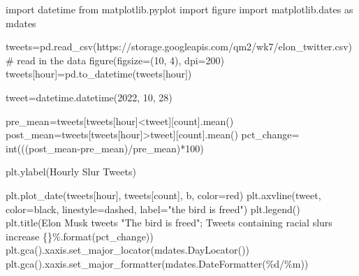 \documentclass[
  letterpaper,
  DIV=11,
  numbers=noendperiod]{scrreprt}
\newenvironment{Shaded}{\begin{snugshade}}{\end{snugshade}}
\newcommand{\BuiltInTok}[1]{\textcolor[rgb]{0.00,0.23,0.31}{#1}}
\newcommand{\CommentTok}[1]{\textcolor[rgb]{0.37,0.37,0.37}{#1}}
\newcommand{\DecValTok}[1]{\textcolor[rgb]{0.68,0.00,0.00}{#1}}
\newcommand{\ImportTok}[1]{\textcolor[rgb]{0.00,0.46,0.62}{#1}}
\newcommand{\NormalTok}[1]{\textcolor[rgb]{0.00,0.23,0.31}{#1}}
\newcommand{\OperatorTok}[1]{\textcolor[rgb]{0.37,0.37,0.37}{#1}}
\newcommand{\SpecialCharTok}[1]{\textcolor[rgb]{0.37,0.37,0.37}{#1}}
\newcommand{\StringTok}[1]{\textcolor[rgb]{0.13,0.47,0.30}{#1}}
\begin{document}
\begin{Shaded}
\begin{Highlighting}[]
\ImportTok{import}\NormalTok{ datetime}
\ImportTok{from}\NormalTok{ matplotlib.pyplot }\ImportTok{import}\NormalTok{ figure}
\ImportTok{import}\NormalTok{ matplotlib.dates }\ImportTok{as}\NormalTok{ mdates}

\NormalTok{tweets}\OperatorTok{=}\NormalTok{pd.read\_csv(}\StringTok{\textquotesingle{}https://storage.googleapis.com/qm2/wk7/elon\_twitter.csv\textquotesingle{}}\NormalTok{) }\CommentTok{\# read in the data}
\NormalTok{figure(figsize}\OperatorTok{=}\NormalTok{(}\DecValTok{10}\NormalTok{, }\DecValTok{4}\NormalTok{), dpi}\OperatorTok{=}\DecValTok{200}\NormalTok{)}
\NormalTok{tweets[}\StringTok{\textquotesingle{}hour\textquotesingle{}}\NormalTok{]}\OperatorTok{=}\NormalTok{pd.to\_datetime(tweets[}\StringTok{\textquotesingle{}hour\textquotesingle{}}\NormalTok{])}

\NormalTok{tweet}\OperatorTok{=}\NormalTok{datetime.datetime(}\DecValTok{2022}\NormalTok{, }\DecValTok{10}\NormalTok{, }\DecValTok{28}\NormalTok{)}

\NormalTok{pre\_mean}\OperatorTok{=}\NormalTok{tweets[tweets[}\StringTok{\textquotesingle{}hour\textquotesingle{}}\NormalTok{]}\OperatorTok{\textless{}}\NormalTok{tweet][}\StringTok{\textquotesingle{}count\textquotesingle{}}\NormalTok{].mean()}
\NormalTok{post\_mean}\OperatorTok{=}\NormalTok{tweets[tweets[}\StringTok{\textquotesingle{}hour\textquotesingle{}}\NormalTok{]}\OperatorTok{\textgreater{}}\NormalTok{tweet][}\StringTok{\textquotesingle{}count\textquotesingle{}}\NormalTok{].mean()}
\NormalTok{pct\_change}\OperatorTok{=} \BuiltInTok{int}\NormalTok{(((post\_mean}\OperatorTok{{-}}\NormalTok{pre\_mean)}\OperatorTok{/}\NormalTok{pre\_mean)}\OperatorTok{*}\DecValTok{100}\NormalTok{)}

\NormalTok{plt.ylabel(}\StringTok{\textquotesingle{}Hourly Slur Tweets\textquotesingle{}}\NormalTok{)}

\NormalTok{plt.plot\_date(tweets[}\StringTok{\textquotesingle{}hour\textquotesingle{}}\NormalTok{], tweets[}\StringTok{\textquotesingle{}count\textquotesingle{}}\NormalTok{], }\StringTok{\textquotesingle{}b\textquotesingle{}}\NormalTok{, color}\OperatorTok{=}\StringTok{\textquotesingle{}red\textquotesingle{}}\NormalTok{)}
\NormalTok{plt.axvline(tweet, color}\OperatorTok{=}\StringTok{\textquotesingle{}black\textquotesingle{}}\NormalTok{, linestyle}\OperatorTok{=}\StringTok{\textquotesingle{}dashed\textquotesingle{}}\NormalTok{, label}\OperatorTok{=}\StringTok{\textquotesingle{}"the bird is freed"\textquotesingle{}}\NormalTok{)}
\NormalTok{plt.legend()}
\NormalTok{plt.title(}\StringTok{\textquotesingle{}Elon Musk tweets "The bird is freed"; Tweets containing racial slurs increase }\SpecialCharTok{\{\}}\StringTok{\%\textquotesingle{}}\NormalTok{.}\BuiltInTok{format}\NormalTok{(pct\_change))}
\NormalTok{plt.gca().xaxis.set\_major\_locator(mdates.DayLocator())}
\NormalTok{plt.gca().xaxis.set\_major\_formatter(mdates.DateFormatter(}\StringTok{\textquotesingle{}}\SpecialCharTok{\%d}\StringTok{/\%m\textquotesingle{}}\NormalTok{))}
\end{Highlighting}
\end{Shaded}
\end{document}
